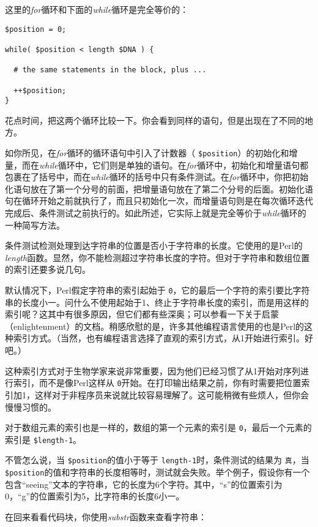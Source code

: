 这里的\textit{for}循环和下面的\textit{while}循环是完全等价的：

\begin{lstlisting}
$position = 0;

while( $position < length $DNA ) {

  # the same statements in the block, plus ...

  ++$position;
}
\end{lstlisting}

花点时间，把这两个循环比较一下。你会看到同样的语句，但是出现在了不同的地方。

如你所见，在\textit{for}循环的循环语句中引入了计数器（ \verb|$position|）的初始化和增量，而在\textit{while}循环中，它们则是单独的语句。在\textit{for}循环中，初始化和增量语句都包裹在了括号中，而在\textit{while}循环的括号中只有条件测试。在\textit{for}循环中，你把初始化语句放在了第一个分号的前面，把增量语句放在了第二个分号的后面。初始化语句在循环开始之前就执行了，而且只初始化一次，而增量语句则是在每次循环迭代完成后、条件测试之前执行的。如此所述，它实际上就是完全等价于\textit{while}循环的一种简写方法。

条件测试检测处理到达字符串的位置是否小于字符串的长度。它使用的是Perl的\textit{length}函数。显然，你不能检测超过字符串长度的字符。但对于字符串和数组位置的索引还要多说几句。

默认情况下，Perl假定字符串的索引起始于 \verb|0|，它的最后一个字符的索引要比字符串的长度小一。问什么不使用起始于1、终止于字符串长度的索引，而是用这样的索引呢？这其中有很多原因，但它们都有些深奥；可以参看一下关于启蒙（enlightenment）的文档。稍感欣慰的是，许多其他编程语言使用的也是Perl的这种索引方式。（当然，也有编程语言选择了直观的索引方式，从1开始进行索引。好吧。）

这种索引方式对于生物学家来说非常重要，因为他们已经习惯了从1开始对序列进行索引，而不是像Perl这样从 \verb|0|开始。在打印输出结果之前，你有时需要把位置索引加1，这样对于非程序员来说就比较容易理解了。这可能稍微有些烦人，但你会慢慢习惯的。

对于数组元素的索引也是一样的，数组的第一个元素的索引是 \verb|0|，最后一个元素的索引是 \verb|$length-1|。

不管怎么说，当 \verb|$position|的值小于等于 \verb|length-1|时，条件测试的结果为 \verb|真|，当 \verb|$position|的值和字符串的长度相等时，测试就会失败。举个例子，假设你有一个包含“seeing”文本的字符串，它的长度为6个字符。其中，“s”的位置索引为0，“g”的位置索引为5，比字符串的长度6小一。

在回来看看代码块，你使用\textit{substr}函数来查看字符串：

